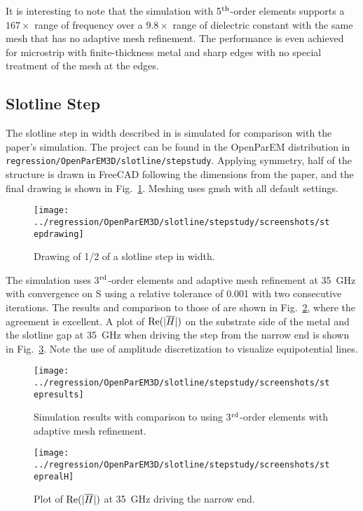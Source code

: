 \documentclass[titlepage]{article}
\renewcommand\_{\textunderscore\linebreak[1]}
\begin{document}
It is interesting to note that the simulation with  5$^{\textnormal{th}}$-order elements supports a $167\times$ range of frequency over a $9.8\times$ range of dielectric constant with the same mesh that has no adaptive mesh refinement.  The performance is even achieved for microstrip with finite-thickness metal and sharp edges with no special treatment of the mesh at the edges.

\subsection{Slotline Step}

The slotline step in width described in \cite{Hirayama} is simulated for comparison with the paper's simulation.  The project can be found in the OpenParEM distribution in \texttt{regression/OpenParEM3D/slotline/step\_study}.  Applying symmetry, half of the structure is drawn in FreeCAD following the dimensions from the paper, and the final drawing is shown in Fig.~\ref{fig:step_drawing}.  Meshing uses gmsh with all default settings.

\begin{figure}[H]
  \centering
  \texttt{[image: ../regression/OpenParEM3D/slotline/step\_study/screenshots/step\_drawing]}
  \caption{Drawing of 1/2 of a slotline step in width.}
  \label{fig:step_drawing}
\end{figure}

The simulation uses 3$^{\textnormal{rd}}$-order elements and adaptive mesh refinement at 35~GHz with convergence on S using a relative tolerance of 0.001 with two consecutive iterations.  The results and comparison to those of \cite{Hirayama} are shown in Fig.~\ref{fig:step_results}, where the agreement is excellent.  A plot of $\textnormal{Re}(|\overline{H}|)$ on the substrate side of the metal and the slotline gap at 35~GHz when driving the step from the narrow end is shown in Fig.~\ref{fig:step_plot}.  Note the use of amplitude discretization to visualize equipotential lines.

\begin{figure}[H]
  \centering
  \texttt{[image: ../regression/OpenParEM3D/slotline/step\_study/screenshots/step\_results]}
  \caption{Simulation results with comparison to \cite{Hirayama} using 3$^{\textnormal{rd}}$-order elements with adaptive mesh refinement.}
  \label{fig:step_results}
\end{figure}

\begin{figure}[H]
  \centering
  \texttt{[image: ../regression/OpenParEM3D/slotline/step\_study/screenshots/step\_real\_H]}
  \caption{Plot of $\textnormal{Re}(|\overline{H}|)$ at 35~GHz driving the narrow end.}
  \label{fig:step_plot}
\end{figure}
\end{document}
